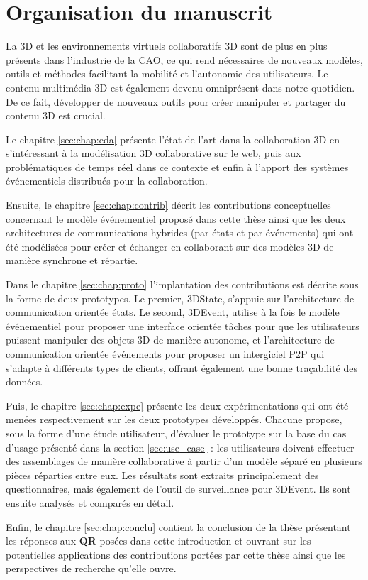 
\section{Organisation du manuscrit}

La \gls{3D} et les environnements virtuels collaboratifs \gls{3D} sont 
de plus en plus présents dans l'industrie de la \gls{CAO}, ce qui rend nécessaires de nouveaux
modèles, outils et méthodes facilitant la mobilité et l'autonomie des utilisateurs. Le contenu multimédia \gls{3D} est également devenu omniprésent dans notre quotidien. De ce fait, développer de nouveaux outils pour créer manipuler et partager du contenu \gls{3D} est crucial.

Le chapitre \ref{sec:chap:eda} présente l'état de l'art dans la collaboration 3D en s'intéressant à la modélisation 3D collaborative sur le web, puis aux problématiques de temps réel dans ce contexte et enfin à l'apport des systèmes événementiels distribués pour la collaboration.

Ensuite, le chapitre \ref{sec:chap:contrib} décrit les contributions conceptuelles concernant le modèle événementiel proposé dans cette thèse ainsi que les deux architectures de communications hybrides (par états et par événements) qui ont été modélisées pour créer et échanger en collaborant sur des modèles 3D de manière synchrone et répartie.

Dans le chapitre \ref{sec:chap:proto} l'implantation des contributions est décrite sous la 
forme de deux prototypes. Le premier, 3DState, s'appuie sur l'architecture de communication 
\og orientée états\fg{}. Le second, 3DEvent, utilise à la fois le modèle événementiel pour 
proposer une interface orientée tâches pour que les utilisateurs puissent manipuler des objets \gls{3D} de manière autonome, et  l'architecture de communication \og orientée 
événements\fg{} pour proposer un intergiciel \gls{P2P} qui s'adapte à différents types de 
clients, offrant également une bonne traçabilité des données.

Puis, le chapitre \ref{sec:chap:expe} présente les deux expérimentations qui ont été menées respectivement sur les deux prototypes développés. Chacune propose, sous la forme d'une étude utilisateur, d'évaluer le prototype sur la base du cas d'usage présenté dans la section \ref{sec:use_case} : les utilisateurs doivent effectuer des assemblages de manière collaborative à partir d'un modèle séparé en plusieurs pièces réparties entre eux. 
Les résultats sont extraits principalement des questionnaires, mais également de l'outil de surveillance pour 3DEvent. Ils sont ensuite analysés et comparés en détail.

Enfin, le chapitre \ref{sec:chap:conclu} contient la conclusion de la thèse présentant les réponses aux \textbf{QR} posées dans cette introduction et ouvrant sur les potentielles applications des contributions portées par cette thèse ainsi que les perspectives de recherche qu'elle ouvre.